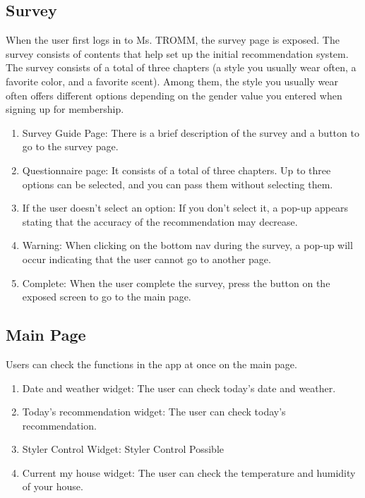 \documentclass[conference]{IEEEtran}
\begin{document}
\subsection{Survey}
When the user first logs in to Ms. TROMM, the survey page is exposed. The survey consists of contents that help set up the initial recommendation system. The survey consists of a total of three chapters (a style you usually wear often, a favorite color, and a favorite scent). Among them, the style you usually wear often offers different options depending on the gender value you entered when signing up for membership.\\
\begin{enumerate}
    \item Survey Guide Page: There is a brief description of the survey and a button to go to the survey page.\\
    \item Questionnaire page: It consists of a total of three chapters. Up to three options can be selected, and you can pass them without selecting them.\\
    \item If the user doesn't select an option: If you don't select it, a pop-up appears stating that the accuracy of the recommendation may decrease.\\
    \item Warning: When clicking on the bottom nav during the survey, a pop-up will occur indicating that the user cannot go to another page.\\
    \item Complete: When the user complete the survey, press the button on the exposed screen to go to the main page.\\
\end{enumerate}

\subsection{Main Page}
Users can check the functions in the app at once on the main page. \\
\begin{enumerate}
    \item Date and weather widget: The user can check today's date and weather.\\
    \item Today's recommendation widget: The user can check today's recommendation.\\
    \item Styler Control Widget: Styler Control Possible\\
    \item Current my house widget: The user can check the temperature and humidity of your house.\\
\end{enumerate}
\end{document}

